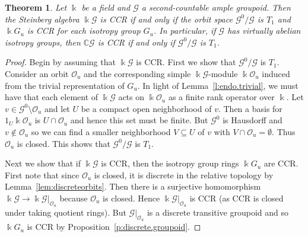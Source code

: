 \documentclass[11pt,reqno]{amsart}
\newtheorem{thm}{Theorem}[section]
\theoremstyle{plain}
\numberwithin{equation}{section}
\newcommand{\G}[0]{\mathscr{G}}
\newcommand{\orb}[0]{\mathcal{O}}
\begin{document}
\begin{thm}\label{t:CCRthm}
Let $\Bbbk$ be a field and $\mathscr G$ a second-countable ample groupoid.  Then the Steinberg algebra $\Bbbk \G$ is CCR if and only if the orbit space $\G^0/\G$  is $T_1$ and  $\Bbbk G_u$ is  CCR for each isotropy group $G_u$.  In particular, if $\G$ has virtually abelian isotropy groups, then $\mathbb C\G$ is CCR if and only if $\G^0/\G$ is $T_1$.
\end{thm}
\begin{proof}
Begin by assuming that $\Bbbk\G$ is CCR. First we show  that $\G^0/\G$ is $T_1$. Consider an orbit $\orb_u$ and the corresponding simple $\Bbbk\mathscr G$-module $\Bbbk\orb_u$ induced from the trivial representation of $G_u$.  In light of Lemma~\ref{l:endo.trivial}, we must have that each element of $\Bbbk\mathscr G$ acts on $\Bbbk\orb_u$ as a finite rank operator over $\Bbbk$.  Let $v\in \mathscr G^0\setminus \orb_u$ and let $U$ be a compact open neighborhood of $v$.  Then  a basis for $1_U\Bbbk \orb_u$ is $U\cap \orb_u$ and hence this set must be finite.  But $\mathscr G^0$ is Hausdorff and $v\notin \orb_u$ so we can find a smaller neighborhood $V\subseteq U$ of $v$ with $V\cap \orb_u=\emptyset$.  Thus $\orb_u$ is closed.  This shows that $\G^0/\G$ is $T_1$.
	
		
	Next we show that if $\Bbbk\G$ is CCR, then the isotropy group rings $\Bbbk G_u$ are CCR.  First note that  since $\orb_u$ is closed, it is discrete in the relative topology by Lemma~\ref{lem:discreteorbits}.  Then there is a surjective homomorphism $\Bbbk\mathscr G\to \Bbbk \mathscr G|_{\orb_u}$ because $\orb_u$ is closed.  Hence $\Bbbk \mathscr G|_{\orb_u}$ is CCR (as CCR is closed under taking quotient rings).  But $\mathscr G|_{\orb_u}$ is a discrete transitive groupoid and so $\Bbbk G_u$ is CCR by Proposition~\ref{p:discrete.groupoid}.
	

\end{proof}
\end{document}
